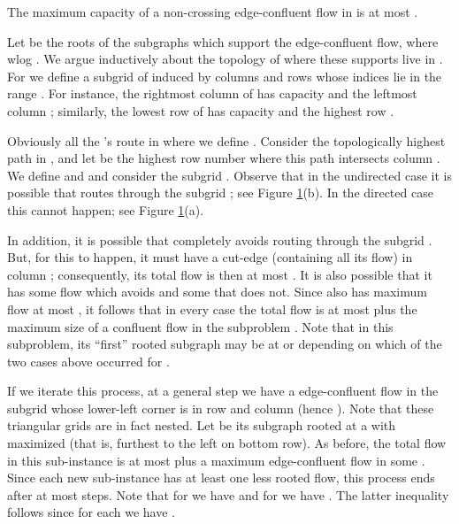 \documentclass[12pt]{article}
\begin{document}
\begin{lemma}\label{lemma.maxflow}
The maximum capacity of a non-crossing edge-confluent flow  in  is at most .
\end{lemma}
Let  be the roots of the subgraphs  which support
the edge-confluent flow, where wlog . We argue inductively about the
topology of where these supports live in .
For  we define a subgrid  of  induced by columns and rows whose
indices lie in the range .
For instance, the rightmost column of  has capacity  and  the
leftmost column ; similarly, the lowest row of  has capacity  and  the
highest row .

Obviously all the 's route in  where we define .
Consider the topologically highest path  in ,
 and let  be the highest row number where this path intersects column .
We define  and  and consider the subgrid .
Observe that in the undirected case it is possible that  routes through the
subgrid ; see Figure \ref{fig:upperT}(b). In the directed case this cannot happen;
see Figure \ref{fig:upperT}(a).

\begin{figure}[h]\centering
    \qquad
    \caption{}\label{fig:upperT}\end{figure}

In addition, it is possible that  completely avoids routing through the subgrid .
But, for this to happen, it must have a cut-edge (containing all its flow) in column ;
consequently, its total flow is then at most . It is also possible that it has some flow which
avoids  and some that does not.
Since  also has maximum flow at most , it follows that in
every case the total flow is at most  plus the
maximum size of a confluent flow in the subproblem . Note that in this subproblem,
its ``first'' rooted subgraph may be at  or  depending on which of the two cases
above occurred for .


If we iterate this process, at a general step  we have a edge-confluent flow in the subgrid 
whose lower-left corner is in row  and column  (hence ). Note that these triangular grids
are in fact nested.
Let  be its subgraph rooted at a  with  maximized (that is, furthest to the left on bottom row).
As before, the total flow in this sub-instance is at most  plus
a maximum edge-confluent flow in some . Since each new sub-instance
has at least one less rooted flow,
this process ends after at most  steps.  Note that for  we have
 and for  we have .
The latter inequality follows since for each  we have .
\end{document}
